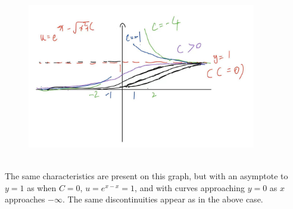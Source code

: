 \documentclass{article}
\begin{document}
\begin{figure}[h]
    \centering
    \includegraphics[width=10cm]{DE-ch2-7-2.jpg}
\end{figure}\\
The same characteristics are present on this graph, but with an asymptote to $y=1$ as when $C=0$, $u=e^{x-x}=1$, and with curves approaching $y=0$ as $x$ approaches $-\infty$. The same discontinuities appear as in the above case.
\hrulefill
\end{document}
